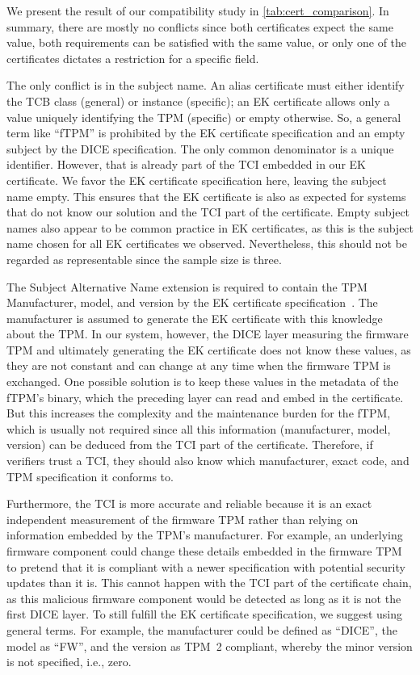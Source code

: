 We present the result of our compatibility study in \autoref{tab:cert_comparison}.
In summary, there are mostly no conflicts since both certificates expect the same value, both requirements can be satisfied with the same value, or only one of the certificates dictates a restriction for a specific field.



The only conflict is in the subject name.
An alias certificate must either identify the TCB class (general) or instance (specific); an EK certificate allows only a value uniquely identifying the TPM (specific) or empty otherwise.
So, a general term like ``fTPM'' is prohibited by the EK certificate specification and an empty subject by the DICE specification.
The only common denominator is a unique identifier.
However, that is already part of the TCI embedded in our EK certificate.
We favor the EK certificate specification here, leaving the subject name empty.
This ensures that the EK certificate is also as expected for systems that do not know our solution and the TCI part of the certificate.
Empty subject names also appear to be common practice in EK certificates, as this is the subject name chosen for all EK certificates we observed.
Nevertheless, this should not be regarded as representable since the sample size is three.

The Subject Alternative Name extension is required to contain the TPM Manufacturer, model, and version by the EK certificate specification~\cite{tcg-ek}.
The manufacturer is assumed to generate the EK certificate with this knowledge about the TPM\@.
In our system, however, the DICE layer measuring the firmware TPM and ultimately generating the EK certificate does not know these values, as they are not constant and can change at any time when the firmware TPM is exchanged.
One possible solution is to keep these values in the metadata of the fTPM's binary, which the preceding layer can read and embed in the certificate.
But this increases the complexity and the maintenance burden for the \ac{fTPM}, which is usually not required since all this information (manufacturer, model, version) can be deduced from the TCI part of the certificate.
Therefore, if verifiers trust a TCI, they should also know which manufacturer, exact code, and TPM specification it conforms to.

Furthermore, the TCI is more accurate and reliable because it is an exact independent measurement of the firmware TPM rather than relying on information embedded by the TPM's manufacturer.
For example, an underlying firmware component could change these details embedded in the firmware TPM to pretend that it is compliant with a newer specification with potential security updates than it is.
This cannot happen with the TCI part of the certificate chain, as this malicious firmware component would be detected as long as it is not the first DICE layer.
To still fulfill the EK certificate specification, we suggest using general terms.
For example, the manufacturer could be defined as ``DICE'', the model as ``FW'', and the version as TPM~2 compliant, whereby the minor version is not specified, i.e., zero.


